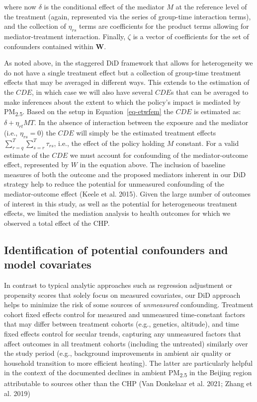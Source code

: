 \documentclass[
  letterpaper,
  DIV=11,
  numbers=noendperiod]{scrartcl}
\begin{document}
where now \(\delta\) is the conditional effect of the mediator \(M\) at
the reference level of the treatment (again, represented via the series
of group-time interaction terms), and the collection of \(\eta_{rs}\)
terms are coefficients for the product terms allowing for
mediator-treatment interaction. Finally, \(\zeta\) is a vector of
coefficients for the set of confounders contained within \(\mathbf{W}\).

As noted above, in the staggered DiD framework that allows for
heterogeneity we do not have a single treatment effect but a collection
of group-time treatment effects that may be averaged in different ways.
This extends to the estimation of the \(CDE\), in which case we will
also have several \(CDE\)s that can be averaged to make inferences about
the extent to which the policy's impact is mediated by
PM\textsubscript{2.5}. Based on the setup in Equation~\ref{eq-etwfem}
the \(CDE\) is estimated as: \(\delta + \eta_{rt}MT\). In the absence of
interaction between the exposure and the mediator (i.e.,
\(\eta_{rs}=0\)) the \(CDE\) will simply be the estimated treatment
effects \(\sum_{r=q}^{T} \sum_{s=r}^{T} \tau_{rs}\), i.e., the effect of
the policy holding \(M\) constant. For a valid estimate of the \(CDE\)
we must account for confounding of the mediator-outcome effect,
represented by \(W\) in the equation above. The inclusion of baseline
measures of both the outcome and the proposed mediators inherent in our
DiD strategy help to reduce the potential for unmeasured confounding of
the mediator-outcome effect (Keele et al. 2015). Given the large number
of outcomes of interest in this study, as well as the potential for
heterogeneous treatment effects, we limited the mediation analysis to
health outcomes for which we observed a total effect of the CHP.

\subsection{Identification of potential confounders and model
covariates}\label{identification-of-potential-confounders-and-model-covariates}

In contrast to typical analytic approaches such as regression adjustment
or propensity scores that solely focus on measured covariates, our DiD
approach helps to minimize the risk of some sources of \emph{unmeasured}
confounding. Treatment cohort fixed effects control for measured and
unmeasured time-constant factors that may differ between treatment
cohorts (e.g., genetics, altitude), and time fixed effects control for
secular trends, capturing any unmeasured factors that affect outcomes in
all treatment cohorts (including the untreated) similarly over the study
period (e.g., background improvements in ambient air quality or
household transition to more efficient heating). The latter are
particularly helpful in the context of the documented declines in
ambient PM\textsubscript{2.5} in the Beijing region attributable to
sources other than the CHP (Van Donkelaar et al. 2021; Zhang et al.
2019)
\end{document}
